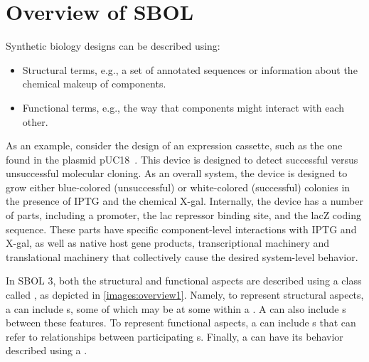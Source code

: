 \section{Overview of SBOL}

Synthetic biology designs can be described using:
\begin{itemize}
\item Structural terms, e.g., a set of annotated sequences or information about the chemical makeup of components.
\item Functional terms, e.g., the way that components might interact with each other. 
\end{itemize}

As an example, consider the design of an expression cassette, such as the one found in the plasmid pUC18~\cite{L08752.1}. This device is designed to detect successful versus unsuccessful molecular cloning.  As an overall system, the device is designed to grow either blue-colored (unsuccessful) or white-colored (successful) colonies in the presence of IPTG and the chemical X-gal. Internally, the device has a number of parts, including a promoter, the lac repressor binding site, and the lacZ coding sequence. 
These parts have specific component-level interactions with IPTG and X-gal, as well as native host gene products, transcriptional machinery and translational machinery that collectively cause the desired system-level behavior. 

In SBOL 3, both the structural and functional aspects are described using a class called , as depicted in \ref{images:overview1}.  
Namely, to represent structural aspects, a  can include s, some of which may be at some  within a .  
A  can also include s between these features.  
To represent functional aspects, a  can include s that can refer to relationships between participating s.  
Finally, a  can have its behavior described using a .

